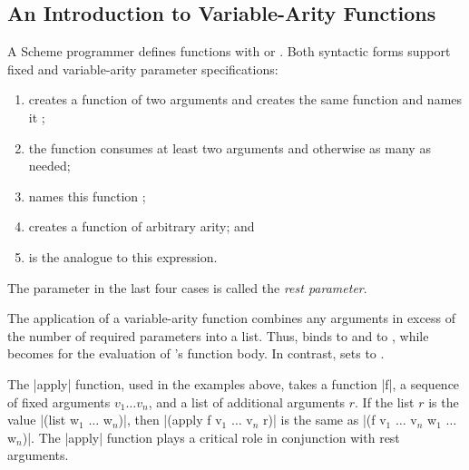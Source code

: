 \begin{schemeregion}
\section{An Introduction to  Variable-Arity Functions}
\label{sec:overview-va}

A Scheme programmer defines functions with  or
 . Both syntactic forms support fixed and variable-arity
 parameter specifications:
\begin{enumerate}
\item {} creates a function of two
arguments and 
creates the same function and names it ;

\item the function 
consumes at least two arguments and otherwise as many as needed; 

\item {} names this
function ;

\item {} creates a function of arbitrary
arity; and

\item {} is the analogue to this
 expression. 
\end{enumerate}
 The parameter  in the last four cases is called the \emph{rest
 parameter}. 

The application of a variable-arity function combines any arguments in
 excess of the number of required parameters into a list.  Thus,  binds  to  and  to ,
 while  becomes  for the evaluation of
 's function body. In contrast,  sets
  to .

The \scheme|apply| function, used in the examples above, takes a
function \scheme|f|, a sequence of fixed arguments $v_1 \ldots v_n$,
and a list of additional arguments $r$.  If the list $r$ is the value
\scheme|(list w$_1$ $\ldots$ w$_n$)|, then \scheme|(apply f v$_1$
$\ldots$ v$_n$ r)| is the same as \scheme|(f v$_1$ $\ldots$ v$_n$ w$_1$
$\ldots$ w$_n$)|.  The \scheme|apply| function plays a critical role in
conjunction with rest arguments.



\end{schemeregion}

